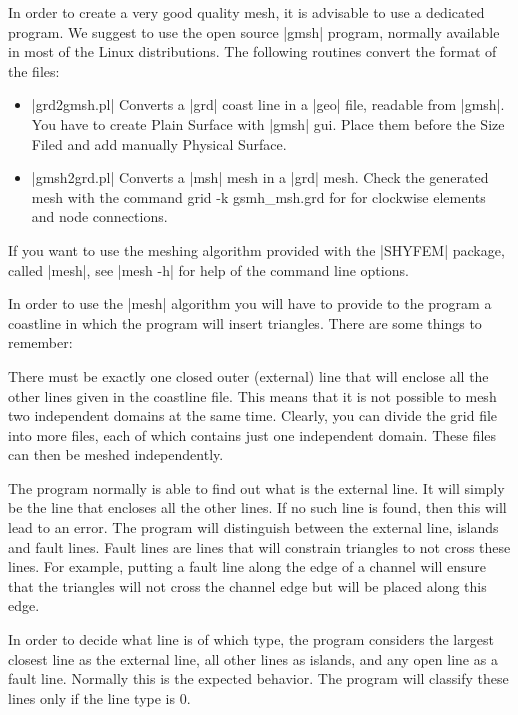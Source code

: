 
In order to create a very good quality mesh, it is advisable to use a
dedicated program. We suggest to use the open source |gmsh| program,
normally available in most of the Linux distributions.
The following routines convert the format of the files:

\begin{itemize}
     \item |grd2gmsh.pl| Converts a |grd| coast line in a |geo| file,
           readable from |gmsh|. You have to create Plain Surface with 
           |gmsh| gui. Place them before the Size Filed and add manually 
           Physical Surface.
     \item |gmsh2grd.pl| Converts a |msh| mesh in a |grd| mesh. Check the
           generated mesh with the command grid -k gsmh\_msh.grd for for
           clockwise elements and node connections.
\end{itemize}

If you want to use the meshing algorithm provided with the |SHYFEM| package,
called |mesh|, see |mesh -h| for help of the command line options. 

In order to use the |mesh| algorithm you will have to provide to the program
a coastline in which the program will insert triangles. There are some
things to remember:

There must be exactly one closed outer (external) line that will enclose
all the other lines given in the coastline file. This means that it is
not possible to mesh two independent domains at the same time. Clearly,
you can divide the grid file into more files, each of which contains
just one independent domain. These files can then be meshed independently.

The program normally is able to find out what is the external line. It
will simply be the line that encloses all the other lines. If no such line
is found, then this will lead to an error. The program will distinguish
between the external line, islands and fault lines. Fault lines are lines
that will constrain triangles to not cross these lines. For example,
putting a fault line along the edge of a channel will ensure that the
triangles will not cross the channel edge but will be placed along
this edge.

In order to decide what line is of which type, the program considers the
largest closest line as the external line, all other lines as islands, and
any open line as a fault line. Normally this is the expected behavior. The
program will classify these lines only if the line type is 0.

